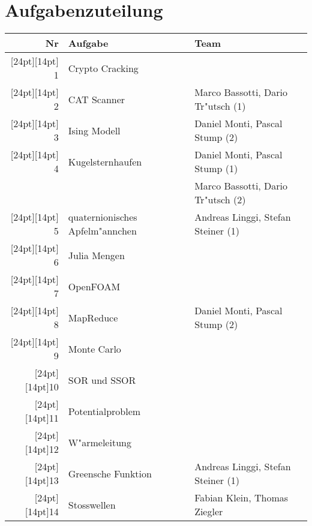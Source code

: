 \documentclass[a4paper,12pt]{article}
\begin{document}
\section{Aufgabenzuteilung}
\def\aufnr#1{\raisebox{0pt}[24pt][14pt]{#1}}
\begin{center}
\begin{tabular}{|r|l|l|}
\hline
Nr&Aufgabe&Team\\
\hline
\aufnr{ 1}&Crypto Cracking                &\\
\hline
\aufnr{ 2}&CAT Scanner                    &Marco Bassotti, Dario Tr"utsch (1)\\
\hline
\aufnr{ 3}&Ising Modell                   &Daniel Monti, Pascal Stump (2)\\
\hline
\aufnr{ 4}&Kugelsternhaufen               &Daniel Monti, Pascal Stump (1)\\
          &                               &Marco Bassotti, Dario Tr"utsch (2)\\
\hline
\aufnr{ 5}&quaternionisches Apfelm"annchen&Andreas Linggi, Stefan Steiner (1)\\
\hline
\aufnr{ 6}&Julia Mengen                   &\\
\hline
\aufnr{ 7}&OpenFOAM                       &\\
\hline
\aufnr{ 8}&MapReduce                      &Daniel Monti, Pascal Stump (2)\\
\hline
\aufnr{ 9}&Monte Carlo                    &\\
\hline
\aufnr{10}&SOR und SSOR                   &\\
\hline
\aufnr{11}&Potentialproblem               &\\
\hline
\aufnr{12}&W"armeleitung                  &\\
\hline
\aufnr{13}&Greensche Funktion             &Andreas Linggi, Stefan Steiner (1)\\
\hline
\aufnr{14}&Stosswellen                    &Fabian Klein, Thomas Ziegler\\
\hline
\end{tabular}
\end{center}
\end{document}
